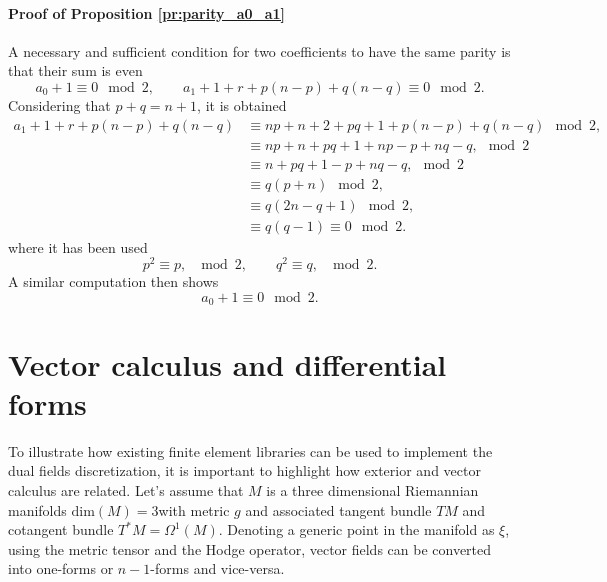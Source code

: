 \documentclass{elsarticle}
\begin{document}
{\paragraph{Proof of Proposition \ref{pr:parity_a0_a1}}
A necessary and sufficient condition for two coefficients to have the same parity is that their sum is even
\begin{equation*}
    a_0 + 1 \equiv 0 \mod{2}, \qquad  a_1 + 1 + r + p(n-p) + q(n-q) \equiv 0 \mod{2}.
\end{equation*}
Considering that $p+q=n+1$, it is obtained
\begin{equation*}
\begin{aligned}
    a_1 + 1 + r + p(n-p) + q(n-q) &\equiv np + n + 2+ pq+1 + p(n-p) + q(n-q)   \mod{2},\\
            &\equiv np + n + pq + 1+ np -p + nq - q, \mod{2} \\
            &\equiv n + pq +1  -p + nq - q, \mod{2} \\
            &\equiv q(p+n) \mod{2}, \\
            &\equiv q(2n -q +1) \mod{2}, \\
            &\equiv q(q - 1) \equiv 0 \mod{2}.
\end{aligned}
\end{equation*}
where it has been used 
$$p^2\equiv p, \; \mod 2, \qquad q^2\equiv q, \; \mod 2.$$
A similar computation then shows
\begin{equation*}
    a_0 + 1\equiv 0 \mod{2}.
\end{equation*}
}


\section{Vector calculus and differential forms}\label{app:vec_ext}
To illustrate how existing finite element libraries can be used to implement the dual fields discretization, it is important to highlight how exterior and vector calculus are related. Let's assume that $M$ is a three dimensional Riemannian manifolds $\mathrm{dim}(M)=3$with metric $g$ and associated tangent bundle $TM$ and cotangent bundle $T^*M =\Omega^1(M)$. Denoting a generic point in the manifold as
$\xi$, using the metric tensor and the Hodge operator, vector fields can be converted into one-forms or $n-1$-forms and vice-versa.
\end{document}
